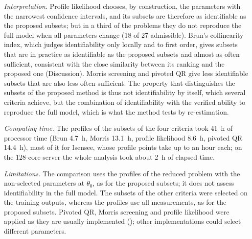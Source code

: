 \emph{Interpretation.} Profile likelihood chooses, by construction, the parameters with the narrowest confidence intervals, and its subsets are therefore as identifiable as the proposed subsets; but in a third of the problems they do not reproduce the full model when all parameters change (18 of 27 admissible). Brun's collinearity index, which judges identifiability only locally and to first order, gives subsets that are in practice as identifiable as the proposed subsets and almost as often sufficient, consistent with the close similarity between its ranking and the proposed one (Discussion). Morris screening and pivoted QR give less identifiable subsets that are also less often sufficient. The property that distinguishes the subsets of the proposed method is thus not identifiability by itself, which several criteria achieve, but the combination of identifiability with the verified ability to reproduce the full model, which is what the method tests by re-estimation.

\emph{Computing time.} The profiles of the subsets of the four criteria took 41~h of processor time (Brun 4.7~h, Morris 13.1~h, profile likelihood 8.6~h, pivoted QR 14.4~h), most of it for Isensee, whose profile points take up to an hour each; on the 128-core server the whole analysis took about 2~h of elapsed time.

\emph{Limitations.} The comparison uses the profiles of the reduced problem with the non-selected parameters at $\theta_0$, as for the proposed subsets; it does not assess identifiability in the full model. The subsets of the other criteria were selected on the training outputs, whereas the profiles use all measurements, as for the proposed subsets. Pivoted QR, Morris screening and profile likelihood were applied as they are usually implemented (); other implementations could select different parameters.

{\scriptsize\setlength{\tabcolsep}{3pt}

}

{\small

}
